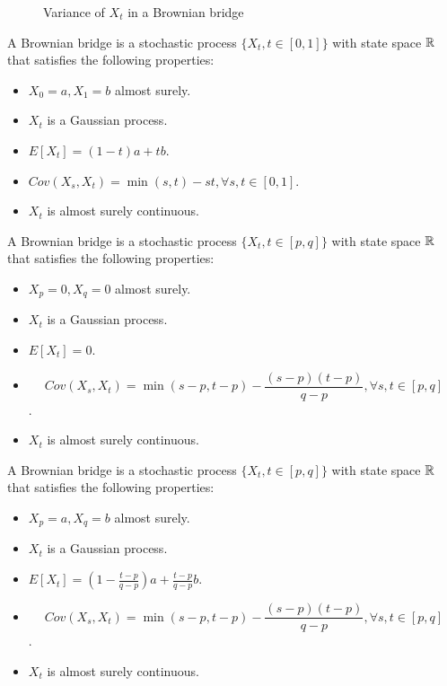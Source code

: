 \begin{refsection}
\begin{figure}
	\caption{Variance of $X_t$ in a Brownian bridge}
\end{figure}



\begin{definition}
	A Brownian bridge is a stochastic process $\{X_t,t\in[0,1]\}$ with state space $\mathbb{R}$ that satisfies the following properties:
	\begin{itemize}
		\item $X_0 = a, X_1 = b$ almost surely.
		\item $X_t$ is a Gaussian process.
		\item $E[X_t] = (1-t)a+tb$.
		\item $Cov(X_s,X_t) = \min(s,t)-st,\forall s,t\in [0,1]$.
		\item $X_t$ is almost surely continuous.
	\end{itemize}
\end{definition}


\begin{definition}
	A Brownian bridge is a stochastic process $\{X_t,t\in[p,q]\}$ with state space $\mathbb{R}$ that satisfies the following properties:
	\begin{itemize}
		\item $X_p = 0, X_q = 0$ almost surely.
		\item $X_t$ is a Gaussian process.
		\item $E[X_t] = 0$.
		\item $$Cov(X_s,X_t) = \min(s-p,t-p)-\frac{(s-p)(t-p)}{q-p},\forall s,t\in [p,q]$$.
		\item $X_t$ is almost surely continuous.
	\end{itemize}
\end{definition}

\begin{definition}
	A Brownian bridge is a stochastic process $\{X_t,t\in[p,q]\}$ with state space $\mathbb{R}$ that satisfies the following properties:
	\begin{itemize}
		\item $X_p = a, X_q = b$ almost surely.
		\item $X_t$ is a Gaussian process.
		\item $E[X_t] = (1-\frac{t-p}{q-p})a+\frac{t-p}{q-p}b$.
		\item $$Cov(X_s,X_t) = \min(s-p,t-p)-\frac{(s-p)(t-p)}{q-p},\forall s,t\in [p,q]$$.
		\item $X_t$ is almost surely continuous.
	\end{itemize}
\end{definition}




\end{refsection}
